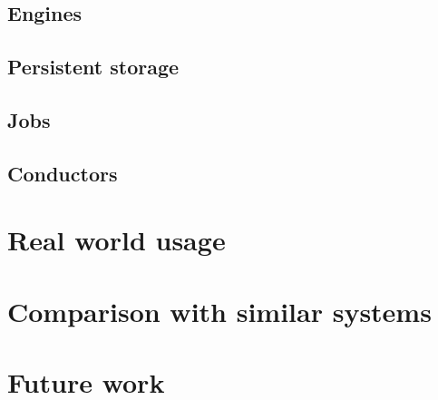 \documentclass[11pt,a4paper]{article}
\begin{document}
\subsection{Engines}

\subsection{Persistent storage}

\subsection{Jobs}

\subsection{Conductors}

\section{Real world usage}

\section{Comparison with similar systems}

\section{Future work}
\end{document}
